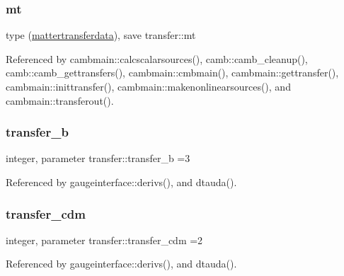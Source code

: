 \mbox{\label{namespacetransfer_abf8737afeb10e8b167c70416ad103a74}} 
\subsubsection{\texorpdfstring{mt}{mt}}
{\footnotesize\ttfamily type (\mbox{\hyperlink{structtransfer_1_1mattertransferdata}{mattertransferdata}}), save transfer\+::mt}



Referenced by cambmain\+::calcscalarsources(), camb\+::camb\+\_\+cleanup(), camb\+::camb\+\_\+gettransfers(), cambmain\+::cmbmain(), cambmain\+::gettransfer(), cambmain\+::inittransfer(), cambmain\+::makenonlinearsources(), and cambmain\+::transferout().

\mbox{\label{namespacetransfer_ab15ebb6605b445eaddd657e94abc151b}} 
\subsubsection{\texorpdfstring{transfer\+\_\+b}{transfer\_b}}
{\footnotesize\ttfamily integer, parameter transfer\+::transfer\+\_\+b =3}



Referenced by gaugeinterface\+::derivs(), and dtauda().

\mbox{\label{namespacetransfer_a9e67898263c714e994816a119937416f}} 
\subsubsection{\texorpdfstring{transfer\+\_\+cdm}{transfer\_cdm}}
{\footnotesize\ttfamily integer, parameter transfer\+::transfer\+\_\+cdm =2}



Referenced by gaugeinterface\+::derivs(), and dtauda().

\mbox{\label{namespacetransfer_a4076f4ea08670377ed92c3a16ced89f0}} 
